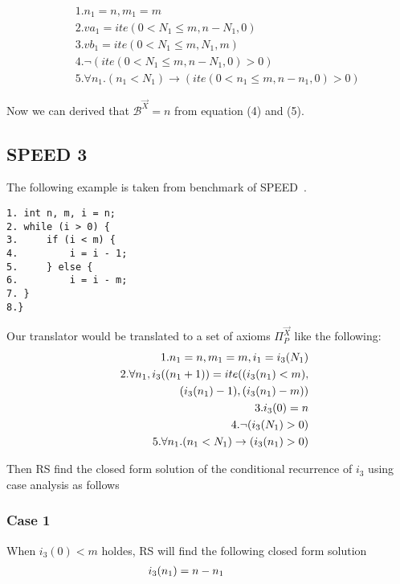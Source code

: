 \begin{eqnarray*}
	&&1. n_1 = n, m_1 = m\\
	&&2. va_1 = ite(0<N_1\leq m,n-N_1,0) \\
	&&3. vb_1 = ite(0<N_1\leq m,N_1,m)\\
	&&4.\neg (ite(0<N_1\leq m,n-N_1,0)>0)\\
	&&5.\forall n_1.(n_1<N_1) \rightarrow (ite(0<n_1\leq m,n-n_1,0)>0)
\end{eqnarray*}

Now we can derived that $\mathcal{B}^{\vec{X}}=n$ from equation (4) and (5).

\subsection{SPEED 3}

The following example is taken from benchmark of SPEED~\cite{speed1}.
\begin{verbatim}
1. int n, m, i = n;
2. while (i > 0) {
3.     if (i < m) { 
4.         i = i - 1;
5.     } else {
6.         i = i - m;
7. }
8.}
\end{verbatim}




Our translator would be translated to a set of axioms $\Pi_P^{\vec{X}}$ like the following:
\begin{eqnarray*}
	&&1. n_1 = n, m_1 = m, i_1 = i_3(N_1)\\
	&&2.\forall n_1,i_3((n_1+1)) = ite((i_3(n_1)<m),\\ &&\hspace*{5em}(i_3(n_1)-1),(i_3(n_1)-m))\\ 
	&&3.i_3(0) = n\\
	&&4.\neg (i_3(N_1)>0)\\
	&&5.\forall n_1.(n_1<N_1) \rightarrow (i_3(n_1)>0)
\end{eqnarray*}

Then RS find the closed form solution of the conditional recurrence of $i_3$ using case analysis as follows

\subsubsection{Case 1} When $i_3(0)<m$ holdes, RS will find the following closed form solution
\begin{eqnarray*}
	&&\hspace*{-5em}i_3(n_1)=n-n_1
\end{eqnarray*}

